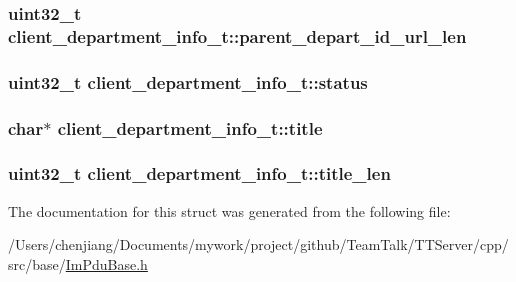 \subsubsection[{parent\+\_\+depart\+\_\+id\+\_\+url\+\_\+len}]{\setlength{\rightskip}{0pt plus 5cm}uint32\+\_\+t client\+\_\+department\+\_\+info\+\_\+t\+::parent\+\_\+depart\+\_\+id\+\_\+url\+\_\+len}\label{structclient__department__info__t_a33a84ebbb6fae569c6d35561f2871959}
\hypertarget{structclient__department__info__t_aa91a77620000841293f3a03a4cd944f8}{}
\subsubsection[{status}]{\setlength{\rightskip}{0pt plus 5cm}uint32\+\_\+t client\+\_\+department\+\_\+info\+\_\+t\+::status}\label{structclient__department__info__t_aa91a77620000841293f3a03a4cd944f8}
\hypertarget{structclient__department__info__t_aee87e5b3e41a36cb589d03a6dc59e147}{}
\subsubsection[{title}]{\setlength{\rightskip}{0pt plus 5cm}char$\ast$ client\+\_\+department\+\_\+info\+\_\+t\+::title}\label{structclient__department__info__t_aee87e5b3e41a36cb589d03a6dc59e147}
\hypertarget{structclient__department__info__t_a8b903a5fbd17b83032585c51a61d1793}{}
\subsubsection[{title\+\_\+len}]{\setlength{\rightskip}{0pt plus 5cm}uint32\+\_\+t client\+\_\+department\+\_\+info\+\_\+t\+::title\+\_\+len}\label{structclient__department__info__t_a8b903a5fbd17b83032585c51a61d1793}


The documentation for this struct was generated from the following file\+:\begin{DoxyCompactItemize}
\item 
/\+Users/chenjiang/\+Documents/mywork/project/github/\+Team\+Talk/\+T\+T\+Server/cpp/src/base/\hyperlink{_im_pdu_base_8h}{Im\+Pdu\+Base.\+h}\end{DoxyCompactItemize}
